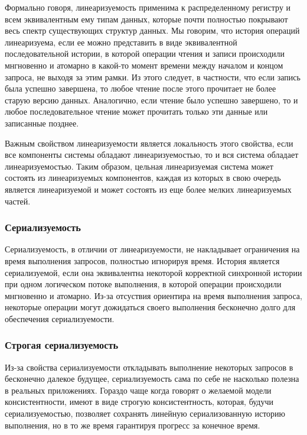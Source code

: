 Формально говоря, линеаризуемость применима к распределенному регистру и всем эквивалентным ему типам данных, которые почти полностью покрывают весь спектр существующих структур данных. Мы говорим, что история операций линеаризуема, если ее можно представить в виде эквивалентной последовательной истории, в которой операции чтения и записи происходили мнгновенно и атомарно в какой-то момент времени между началом и концом запроса, не выходя за этим рамки. Из этого следует, в частности, что если запись была успешно завершена, то любое чтение после этого прочитает не более старую версию данных. Аналогично, если чтение было успешно завершено, то и любое последовательное чтение может прочитать только эти данные или записанные позднее.

Важным свойством линеаризуемости является локальность этого свойства, если все компоненты системы обладают линеаризуемостью, то и вся система обладает линеаризуемостью. Таким образом, цельная линеаризуемая система может состоять из линеаризуемых компонентов, каждая из которых в свою очередь является линеаризуемой и может состоять из еще более мелких линеаризуемых частей.

\subsubsection{Сериализуемость}

Сериализуемость, в отличии от линеаризуемости, не накладывает ограничения на время выполнения запросов, полностью игнорируя время. История является сериализуемой, если она эквивалентна некоторой корректной синхронной истории при одном логическом потоке выполнения, в которой операции происходили мнгновенно и атомарно. Из-за отсуствия ориентира на время выполнения запроса, некоторые операции могут дожидаться своего выполнения бесконечно долго для обеспечения сериализуемости.

\subsubsection{Строгая сериализуемость}

Из-за свойства сериализуемости откладывать выполнение некоторых запросов в бесконечно далекое будущее, сериализуемость сама по себе не насколько полезна в реальных приложениях. Гораздо чаще когда говорят о желаемой модели консистентности, имеют в виде строгую консистентность, которая, будучи сериализуемостью, позволяет сохранять линейную сериализованную историю выполнения, но в то же время гарантируя прогресс за конечное время.

